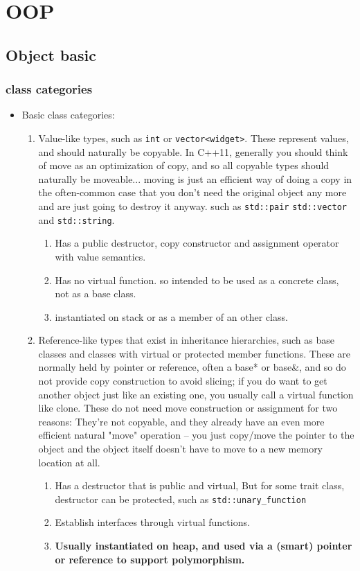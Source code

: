 \documentclass[a4paper,11pt,twoside]{book}
\begin{document}
\chapter{OOP}

\section{Object basic}

\subsection{class categories}
\begin{itemize}
	\item Basic class categories:
	\begin{enumerate}
			
		\item Value-like types, such as \texttt{int} or \texttt{vector<widget>}. These represent values, and should naturally be copyable. In C++11, generally you should think of move as an optimization of copy, and so all copyable types should naturally be moveable... moving is just an efficient way of doing a copy in the often-common case that you don't need the original object any more and are just going to destroy it anyway. such as \texttt{std::pair} \texttt{std::vector} and \texttt{std::string}.
		
		\begin{enumerate}
			\item Has a public destructor, copy constructor and assignment operator with value semantics.
			\item Has no virtual function. so intended to be used as a concrete class, not as a base class.
			\item instantiated on stack or as a member of an other class.
		\end{enumerate}
		
		\item Reference-like types that exist in inheritance hierarchies, such as base classes and classes with virtual or protected member functions. These are normally held by pointer or reference, often a base* or base\&, and so do not provide copy construction to avoid slicing; if you do want to get another object just like an existing one, you usually call a virtual function like clone. These do not need move construction or assignment for two reasons: They're not copyable, and they already have an even more efficient natural "move" operation -- you just copy/move the pointer to the object and the object itself doesn't have to move to a new memory location at all.
		\begin{enumerate}
			\item Has a destructor that is public and virtual, But for some trait class, destructor can be protected, such as \texttt{std::unary\_function}
            \item Establish interfaces through virtual functions.
			\item \textbf{Usually instantiated on heap, and used via a (smart) pointer or reference to support polymorphism.} 
        \end{enumerate}
		


\end{enumerate}
\end{itemize}
\end{document}
